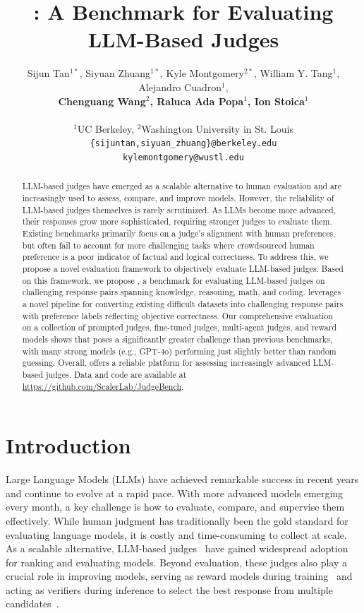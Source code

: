 \documentclass{article} %
\title{\sys: A Benchmark for Evaluating LLM-Based Judges}
\author{Sijun Tan$^{1*}$, Siyuan Zhuang$^{1*}$, Kyle Montgomery$^{2*}$, William Y. Tang$^{1}$, Alejandro Cuadron$^{1}$, \\\textbf{Chenguang Wang$^{2}$, Raluca Ada Popa$^{1}$, Ion Stoica$^{1}$} \\\\
$^{1}$UC Berkeley, $^{2}$Washington University in St. Louis \\
\texttt{\{sijuntan,siyuan\_zhuang\}@berkeley.edu} \\
\texttt{kylemontgomery@wustl.edu}
}
\begin{document}
\maketitle

\def\thefootnote{*}\def\thefootnote{\arabic{footnote}}

\begin{abstract}
LLM-based judges have emerged as a scalable alternative to human evaluation and are increasingly used to assess, compare, and improve models. However, the reliability of LLM-based judges themselves is rarely scrutinized. As LLMs become more advanced, their responses grow more sophisticated, requiring stronger judges to evaluate them. Existing benchmarks primarily focus on a judge’s alignment with human preferences, but often fail to account for more challenging tasks where crowdsourced human preference is a poor indicator of factual and logical correctness. To address this, we propose a novel evaluation framework to objectively evaluate LLM-based judges. Based on this framework, we propose \sys, a benchmark for evaluating LLM-based judges on challenging response pairs spanning knowledge, reasoning, math, and coding. \sys leverages a novel pipeline for converting existing difficult datasets into challenging response pairs with preference labels reflecting objective correctness. Our comprehensive evaluation on a collection of prompted judges, fine-tuned judges, multi-agent judges, and reward models shows that \sys poses a significantly greater challenge than previous benchmarks, with many strong models (e.g., GPT-4o) performing just slightly better than random guessing. Overall, \sys offers a reliable platform for assessing increasingly advanced LLM-based judges. Data and code are available at \url{https://github.com/ScalerLab/JudgeBench}.
\end{abstract}

\section{Introduction} 

Large Language Models (LLMs) have achieved remarkable success in recent years and continue to evolve at a rapid pace. With more advanced models emerging every month, a key challenge is how to evaluate, compare, and supervise them effectively. While human judgment has traditionally been the gold standard for evaluating language models, it is costly and time-consuming to collect at scale. As a scalable alternative, LLM-based judges~\citep{zheng2024judging} have gained widespread adoption for ranking and evaluating models. Beyond evaluation, these judges also play a crucial role in improving models, serving as reward models during training~\citep{yuan2024selfreward, luo2024wizardlm2} and acting as verifiers during inference to select the best response from multiple candidates~\citep{cobbe2021verify, lightman2023verify}.
\end{document}
